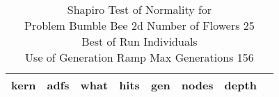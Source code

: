 \begin{table}[H]
\caption{Shapiro Test of Normality for \\ Problem  Bumble Bee 2d  Number of Flowers 25\\Best of Run Individuals \\ Use of Generation Ramp  Max Generations 156\\}
\begin{center}
\scalebox{0.8} %
{
\begin{tabular}{lrrrrrrr}
\hline
kern & adfs & what & hits & gen & nodes & depth \\
\hline


\end{tabular}
}
\end{center}
\end{table}


